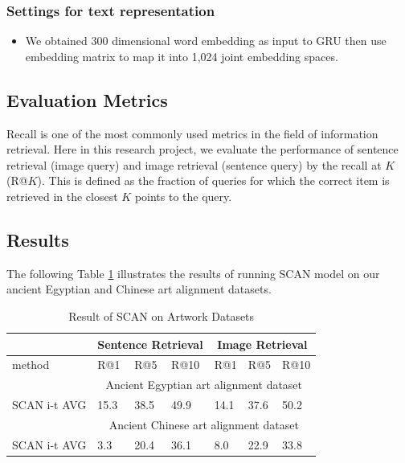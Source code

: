 \subsubsection{Settings for text representation}

\begin{itemize}
    \item We obtained 300 dimensional word embedding as input to GRU then use embedding matrix to map it into 1,024 joint embedding spaces.
\end{itemize}

\subsection{Evaluation Metrics}

Recall is one of the most commonly used metrics in the field of information retrieval. Here in this research project, we evaluate the performance of sentence retrieval (image query) and image retrieval (sentence query) by the recall at $K$ (R@$K$). This is defined as the fraction of queries for which the correct item is retrieved in the closest $K$ points to the query. 

\subsection{Results}

The following Table \ref{table:resultscan} illustrates the results of running SCAN model on our ancient Egyptian and Chinese art alignment datasets.

\begin{table}[h!]
\centering
\begin{tabular}{lllllll}
                       & \multicolumn{3}{c}{Sentence Retrieval} & \multicolumn{3}{c}{Image Retrieval} \\ \hline
method                 & R@1         & R@5         & R@10       & R@1        & R@5        & R@10      \\ \hline
\multicolumn{1}{r}{}   & \multicolumn{6}{c}{Ancient Egyptian art alignment dataset}                   \\ \hline
SCAN i-t AVG & 15.3        & 38.5        & 49.9       & 14.1       & 37.6       & 50.2      \\ \hline
\multicolumn{1}{r}{}   & \multicolumn{6}{c}{Ancient Chinese art alignment dataset}                    \\ \hline
SCAN i-t AVG & 3.3         & 20.4        & 36.1       & 8.0        & 22.9       & 33.8     
\end{tabular}
\caption{Result of SCAN on Artwork Datasets}
\label{table:resultscan}
\end{table}

